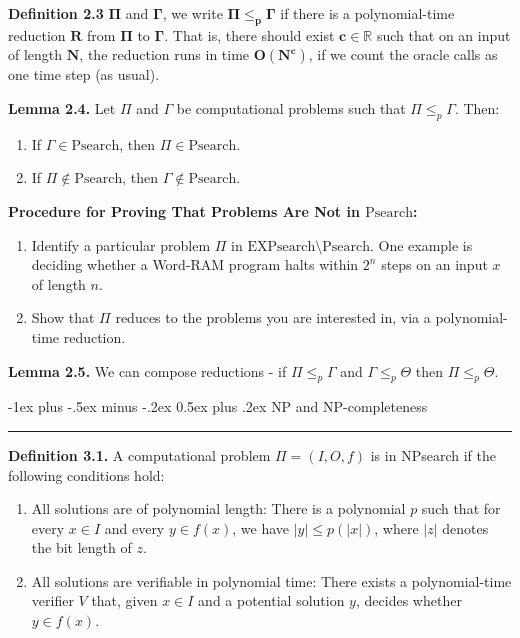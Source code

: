 \documentclass[10pt,landscape]{article}
\makeatletter
\renewcommand{\section}{\@startsection{section}{1}{0mm}%
                                {-1ex plus -.5ex minus -.2ex}%
                                {0.5ex plus .2ex}%
                                {\normalfont\large\bfseries}}
\makeatother
\begin{document}
\begin{multicols*}{3}
\textbf{Definition 2.3}
$\mathbf{\Pi}$ and $\mathbf{\Gamma}$, we write $\mathbf{\Pi \leq_p \Gamma}$ if there is a polynomial-time reduction $\mathbf{R}$ from $\mathbf{\Pi}$ to $\mathbf{\Gamma}$. That is, there should exist $\mathbf{c \in \mathbb{R}}$ such that on an input of length $\mathbf{N}$, the reduction runs in time $\mathbf{O(N^{c})}$, if we count the oracle calls as one time step (as usual).

\smallskip

\textbf{Lemma 2.4.} Let $\Pi$ and $\Gamma$ be computational problems such that $\Pi \leq_p \Gamma$. Then:
\begin{enumerate}
  \item If $\Gamma \in \text{Psearch}$, then $\Pi \in \text{Psearch}$.
  \item If $\Pi \notin \text{Psearch}$, then $\Gamma \notin \text{Psearch}$.
\end{enumerate}

\textbf{Procedure for Proving That Problems Are Not in $\text{Psearch}$:}

\begin{enumerate}
  \item Identify a particular problem $\Pi$ in $\text{EXPsearch} \setminus \text{Psearch}$. One example is deciding whether a Word-RAM program halts within $2^n$ steps on an input $x$ of length $n$.
  \item Show that $\Pi$ reduces to the problems you are interested in, via a polynomial-time reduction.
\end{enumerate}


\smallskip

\textbf{Lemma 2.5.} We can compose reductions - if $\Pi \leq_p \Gamma$ and $\Gamma \leq_p \Theta$ then $\Pi \leq_p \Theta$.

\section{NP and NP-completeness}\smallskip \hrule height 2pt \smallskip

\textbf{Definition 3.1.} A computational problem $\Pi = (I, O, f)$ is in NPsearch if the following conditions hold:
\begin{enumerate}
  \item All solutions are of polynomial length: There is a polynomial $p$ such that for every $x \in I$ and every $y \in f(x)$, we have $|y| \leq p(|x|)$, where $|z|$ denotes the bit length of $z$.
  \item All solutions are verifiable in polynomial time: There exists a polynomial-time verifier $V$ that, given $x \in I$ and a potential solution $y$, decides whether $y \in f(x)$.
\end{enumerate}


\end{multicols*}
\end{document}
